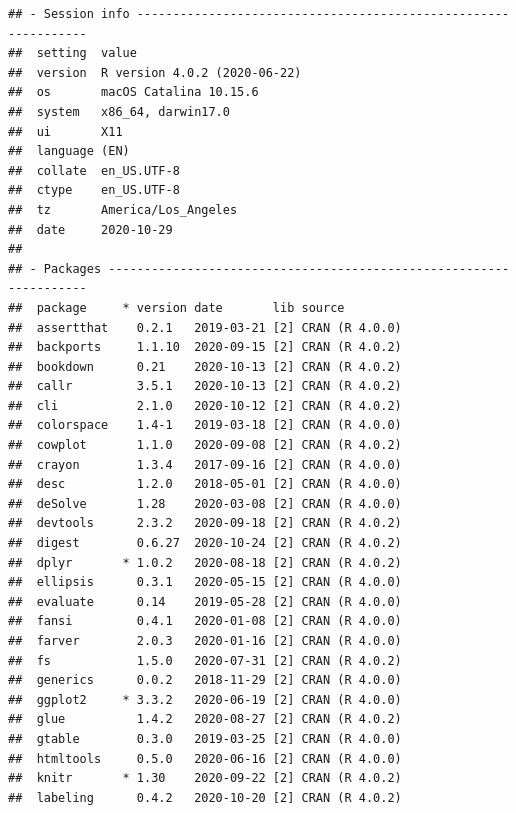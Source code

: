 \documentclass[]{elsarticle} %
\begin{document}
\begin{verbatim}
## - Session info ---------------------------------------------------------------
##  setting  value                       
##  version  R version 4.0.2 (2020-06-22)
##  os       macOS Catalina 10.15.6      
##  system   x86_64, darwin17.0          
##  ui       X11                         
##  language (EN)                        
##  collate  en_US.UTF-8                 
##  ctype    en_US.UTF-8                 
##  tz       America/Los_Angeles         
##  date     2020-10-29                  
## 
## - Packages -------------------------------------------------------------------
##  package     * version date       lib source                            
##  assertthat    0.2.1   2019-03-21 [2] CRAN (R 4.0.0)                    
##  backports     1.1.10  2020-09-15 [2] CRAN (R 4.0.2)                    
##  bookdown      0.21    2020-10-13 [2] CRAN (R 4.0.2)                    
##  callr         3.5.1   2020-10-13 [2] CRAN (R 4.0.2)                    
##  cli           2.1.0   2020-10-12 [2] CRAN (R 4.0.2)                    
##  colorspace    1.4-1   2019-03-18 [2] CRAN (R 4.0.0)                    
##  cowplot       1.1.0   2020-09-08 [2] CRAN (R 4.0.2)                    
##  crayon        1.3.4   2017-09-16 [2] CRAN (R 4.0.0)                    
##  desc          1.2.0   2018-05-01 [2] CRAN (R 4.0.0)                    
##  deSolve       1.28    2020-03-08 [2] CRAN (R 4.0.0)                    
##  devtools      2.3.2   2020-09-18 [2] CRAN (R 4.0.2)                    
##  digest        0.6.27  2020-10-24 [2] CRAN (R 4.0.2)                    
##  dplyr       * 1.0.2   2020-08-18 [2] CRAN (R 4.0.2)                    
##  ellipsis      0.3.1   2020-05-15 [2] CRAN (R 4.0.0)                    
##  evaluate      0.14    2019-05-28 [2] CRAN (R 4.0.0)                    
##  fansi         0.4.1   2020-01-08 [2] CRAN (R 4.0.0)                    
##  farver        2.0.3   2020-01-16 [2] CRAN (R 4.0.0)                    
##  fs            1.5.0   2020-07-31 [2] CRAN (R 4.0.2)                    
##  generics      0.0.2   2018-11-29 [2] CRAN (R 4.0.0)                    
##  ggplot2     * 3.3.2   2020-06-19 [2] CRAN (R 4.0.0)                    
##  glue          1.4.2   2020-08-27 [2] CRAN (R 4.0.2)                    
##  gtable        0.3.0   2019-03-25 [2] CRAN (R 4.0.0)                    
##  htmltools     0.5.0   2020-06-16 [2] CRAN (R 4.0.0)                    
##  knitr       * 1.30    2020-09-22 [2] CRAN (R 4.0.2)                    
##  labeling      0.4.2   2020-10-20 [2] CRAN (R 4.0.2)                    

\end{verbatim}
\end{document}
